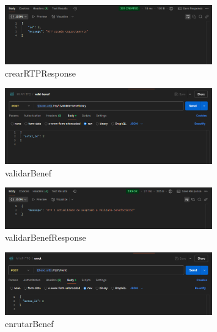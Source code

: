     \begin{figure}[H]
    \centering
    \includegraphics[width=0.8\textwidth]{Imagenes/crearRTPResponse.png}
    \caption{crearRTPResponse}
    \label{fig:crearRTPResponse}
    \end{figure}

    \begin{figure}[H]
    \centering
    \includegraphics[width=0.8\textwidth]{Imagenes/validarBenef.png}
    \caption{validarBenef}
    \label{fig:validarBenef}
    \end{figure}

    \begin{figure}[H]
    \centering
    \includegraphics[width=0.8\textwidth]{Imagenes/validarBenefResponse.png}
    \caption{validarBenefResponse}
    \label{fig:validarBenefResponse}
    \end{figure}

    \begin{figure}[H]
    \centering
    \includegraphics[width=0.8\textwidth]{Imagenes/enrutarBenef.png}
    \caption{enrutarBenef}
    \label{fig:enrutarBenef}
    \end{figure}


